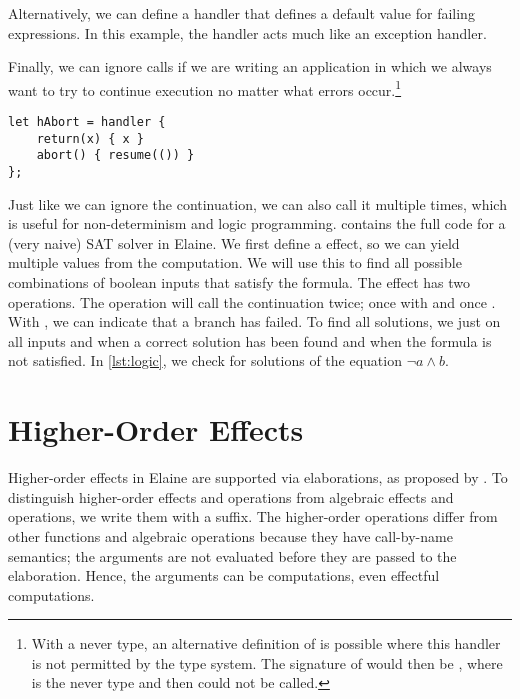 
Alternatively, we can define a handler that defines a default value for failing expressions. In this example, the handler acts much like an exception handler.


Finally, we can ignore  calls if we are writing an application in which we always want to try to continue execution no matter what errors occur.\footnote{With a never type, an alternative definition of  is possible where this handler is not permitted by the type system. The signature of  would then be , where \el{!} is the never type and then  could not be called.}

\begin{lstlisting}[language=elaine,style=fancy]
let hAbort = handler {
    return(x) { x }
    abort() { resume(()) }
};
\end{lstlisting}

Just like we can ignore the continuation, we can also call it multiple times, which is useful for non-determinism and logic programming.  contains the full code for a (very naive) SAT solver in Elaine. We first define a  effect, so we can yield multiple values from the computation. We will use this to find all possible combinations of boolean inputs that satisfy the formula. The  effect has two operations. The  operation will call the continuation twice; once with  and once . With , we can indicate that a branch has failed. To find all solutions, we just  on all inputs and  when a correct solution has been found and  when the formula is not satisfied. In \cref{lst:logic}, we check for solutions of the equation $\neg a \wedge b$.


\section{Higher-Order Effects}


Higher-order effects in Elaine are supported via elaborations, as proposed by \textcite{bach_poulsen_hefty_2023}. To distinguish higher-order effects and operations from algebraic effects and operations, we write them with a \el{!} suffix. The higher-order operations differ from other functions and algebraic operations because they have call-by-name semantics; the arguments are not evaluated before they are passed to the elaboration. Hence, the arguments can be computations, even effectful computations.

